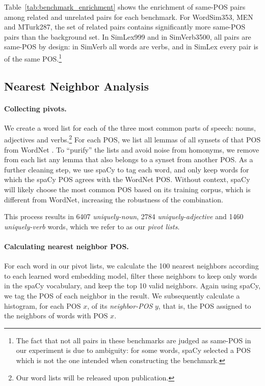 \documentclass[11pt,a4paper]{article}
\begin{document}
    Table~\ref{tab:benchmark_enrichment} shows the enrichment of same-POS pairs
    among related and unrelated pairs for each benchmark.
    For WordSim353, MEN and MTurk287, the set of related pairs
    contains significantly more same-POS pairs than the background set.
    In SimLex999 and in SimVerb3500, all pairs are same-POS by design:
    in SimVerb all words are verbs, and in SimLex every pair is of the same
    POS.\footnote{The fact that not all pairs in these benchmarks are judged as same-POS
    in our experiment is due to ambiguity: for some words, spaCy selected a POS
    which is not the one intended when constructing the benchmark.}
    
    
    \subsection{Nearest Neighbor Analysis}\label{sec:interchangeability_exp}
        
    \paragraph{Collecting pivots.}
    
    We create a word list for each of the three most
    common parts of speech:
    nouns, adjectives and verbs.\footnote{Our word lists will be released upon publication.}
    For each POS, we list all lemmas of all synsets of that POS from
    WordNet \cite{miller1998wordnet}.
    To ``purify'' the lists and avoid noise from homonyms,
    we remove from each list any lemma that also belongs to a synset from
    another POS.
    As a further cleaning step, we use spaCy to tag each word,
    and only keep words for which the spaCy POS agrees with the WordNet POS.
    Without context, spaCy will likely choose the most
    common POS based on its training corpus, which is different from WordNet,
    increasing the robustness of the combination.
    
    This process results in 6407 \textit{uniquely-noun}, 2784 \textit{uniquely-adjective}
    and 1460 \textit{uniquely-verb} words, which we refer to as our \textit{pivot lists}.
    
    \paragraph{Calculating nearest neighbor POS.}
    
    For each word in our pivot lists, we calculate the 100 nearest neighbors
    according to each learned word embedding model, filter these neighbors to
    keep only words in the spaCy vocabulary, and keep the top 10 valid neighbors.
    Again using spaCy, we tag the POS of each neighbor in the result.
    We subsequently calculate a histogram, for each POS $x$, of its
    \textit{neighbor-POS} $y$, that is, the POS assigned to the neighbors of
    words with POS $x$.
    
\end{document}
